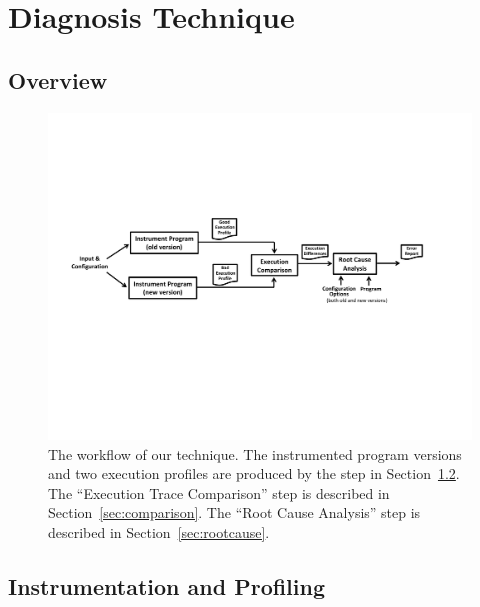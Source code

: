 \section{Diagnosis Technique}
\label{sec:technique}

\subsection{Overview}

\begin{figure}[t]
  \centerline{\includegraphics[scale=0.72]{workflow}}
  \vspace*{-2ex}\caption {{\label{fig:overview} The workflow of
  our \ourtool technique. The instrumented program versions and
  two execution profiles are produced by the step in Section~\ref{sec:profiling}. 
  The ``Execution Trace Comparison'' step is described in
  Section~\ref{sec:comparison}. The ``Root Cause Analysis'' step
  is described in Section~\ref{sec:rootcause}.
}}
\end{figure}


\subsection{Instrumentation and Profiling}
\label{sec:profiling}

